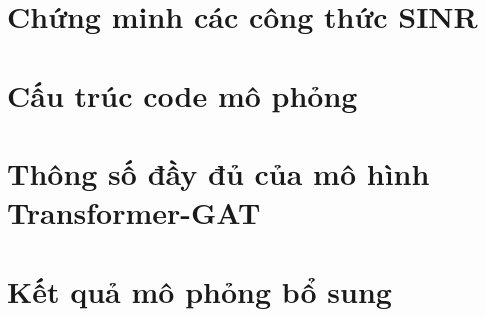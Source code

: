 \appendix

\chapter{Chứng minh các công thức SINR}
\label{app:sinr-proof}

\chapter{Cấu trúc code mô phỏng}
\label{app:code}

\chapter{Thông số đầy đủ của mô hình Transformer-GAT}
\label{app:tgat-params}

\chapter{Kết quả mô phỏng bổ sung}
\label{app:extra-results}
